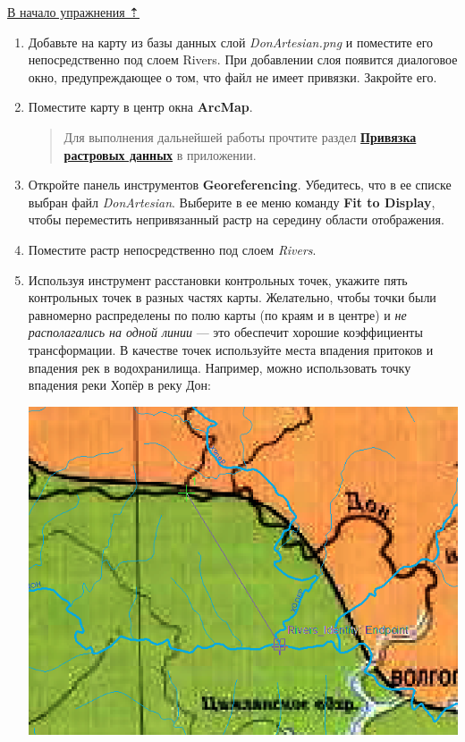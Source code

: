 \documentclass[]{book}
\theoremstyle{definition}
\theoremstyle{definition}
\theoremstyle{definition}
\theoremstyle{remark}
\begin{document}
\protect\hyperlink{map-ref-hydrogeologic}{В начало упражнения ⇡}

\begin{enumerate}
\def\labelenumi{\arabic{enumi}.}
\item
  Добавьте на карту из базы данных слой \emph{DonArtesian.png} и
  поместите его непосредственно под слоем Rivers. При добавлении слоя
  появится диалоговое окно, предупреждающее о том, что файл не имеет
  привязки. Закройте его.
\item
  Поместите карту в центр окна \textbf{ArcMap}.

  \begin{quote}
  Для выполнения дальнейшей работы прочтите раздел
  \textbf{\protect\hyperlink{manual-georef}{Привязка растровых данных}}
  в приложении.
  \end{quote}
\item
  Откройте панель инструментов \textbf{Georeferencing}. Убедитесь, что в
  ее списке выбран файл \emph{DonArtesian}. Выберите в ее меню команду
  \textbf{Fit to Display}, чтобы переместить непривязанный растр на
  середину области отображения.
\item
  Поместите растр непосредственно под слоем \emph{Rivers}.
\item
  Используя инструмент расстановки контрольных точек, укажите пять
  контрольных точек в разных частях карты. Желательно, чтобы точки были
  равномерно распределены по полю карты (по краям и в центре) и \emph{не
  располагались на одной линии} --- это обеспечит хорошие коэффициенты
  трансформации. В качестве точек используйте места впадения притоков и
  впадения рек в водохранилища. Например, можно использовать точку
  впадения реки Хопёр в реку Дон:

  \includegraphics{images/Ex06/image10.png}


\end{enumerate}
\end{document}
